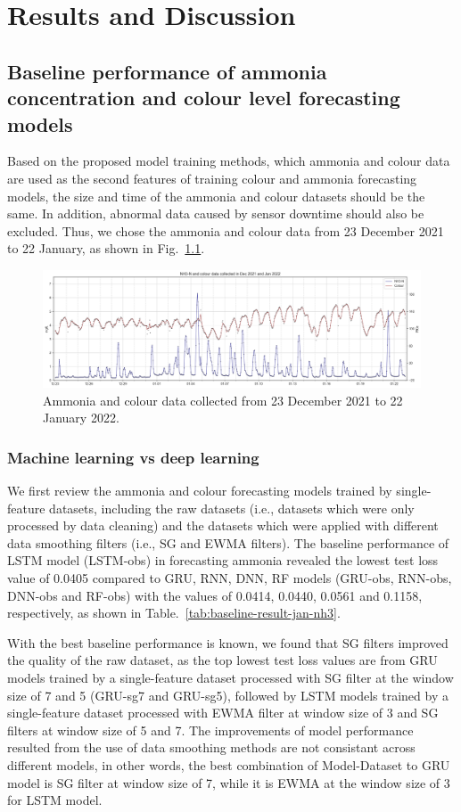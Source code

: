 \chapter{Results and Discussion}
\section{Baseline performance of ammonia concentration and colour level forecasting models}
Based on the proposed model training methods, which ammonia and colour data are used as the second features of training colour and ammonia forecasting models, the size and time of the ammonia and colour datasets should be the same. In addition, abnormal data caused by sensor downtime should also be excluded. Thus, we chose the ammonia and colour data from 23 December 2021 to 22 January, as shown in Fig.~\ref{fig:nh3-color-data}.

\begin{figure}[h]
    \centering
    \includegraphics[width=1.0\columnwidth]{imgs/results/data.png}
    \caption{Ammonia and colour data collected from 23 December 2021 to 22 January 2022.}
    \label{fig:nh3-color-data}
  \end{figure}

\subsection{Machine learning vs deep learning}
We first review the ammonia and colour forecasting models trained by single-feature datasets, including the raw datasets (i.e., datasets which were only processed by data cleaning) and the datasets which were applied with different data smoothing filters (i.e., SG and EWMA filters). The baseline performance of LSTM model (LSTM-obs) in forecasting ammonia revealed the lowest test loss value of 0.0405 compared to GRU, RNN, DNN, RF models (GRU-obs, RNN-obs, DNN-obs and RF-obs) with the values of 0.0414, 0.0440, 0.0561 and 0.1158, respectively, as shown in Table.~\ref{tab:baseline-result-jan-nh3}.

With the best baseline performance is known, we found that SG filters improved the quality of the raw dataset, as the top lowest test loss values are from GRU models trained by a single-feature dataset processed with SG filter at the window size of 7 and 5 (GRU-sg7 and GRU-sg5), followed by LSTM models trained by a single-feature dataset processed with EWMA filter at window size of 3 and SG filters at window size of 5 and 7. The improvements of model performance resulted from the use of data smoothing methods are not consistant across different models, in other words, the best combination of Model-Dataset to GRU model is SG filter at window size of 7, while it is EWMA at the window size of 3 for LSTM model.

